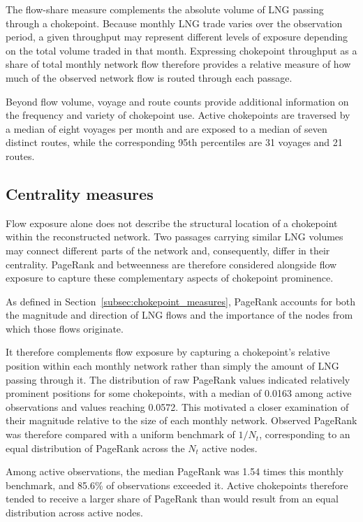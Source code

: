\documentclass[pdftex,12pt,openright,a4paper,oneside]{book}
\begin{document}
The flow-share measure complements the absolute volume of LNG passing through a chokepoint. 
Because monthly LNG trade varies over the observation period, a given throughput may represent different levels of exposure depending on the total volume traded in that month. 
Expressing chokepoint throughput as a share of total monthly network flow therefore provides a relative measure of how much of the observed network flow is routed through each passage.

Beyond flow volume, voyage and route counts provide additional information on the frequency and variety of chokepoint use. Active chokepoints are traversed by a median of eight voyages per month and are exposed to a median of seven distinct routes, while the corresponding 95th percentiles are 31 voyages and 21 routes.

\subsection{Centrality measures}
\label{subsec:chokepoint_centrality}

Flow exposure alone does not describe the structural location of a chokepoint within the reconstructed network. 
Two passages carrying similar LNG volumes may connect different parts of the network and, consequently, differ in their centrality.
PageRank and betweenness are therefore considered alongside flow exposure to capture these complementary aspects of chokepoint prominence.

As defined in Section~\ref{subsec:chokepoint_measures}, PageRank accounts for both the magnitude and direction of LNG flows and the importance of the nodes from which those flows originate.

It therefore complements flow exposure by capturing a chokepoint's relative position within each monthly network rather than simply the amount of LNG passing through it. 
The distribution of raw PageRank values indicated relatively prominent positions for some chokepoints, with a median of 0.0163 among active observations and values reaching 0.0572. This motivated a closer examination of their magnitude relative to the size of each monthly network. Observed PageRank was therefore compared with a uniform benchmark of \(1/N_t\), corresponding to an equal distribution of PageRank across the \(N_t\) active nodes.

Among active observations, the median PageRank was 1.54 times this monthly benchmark, and 85.6\% of observations exceeded it. Active chokepoints therefore tended to receive a larger share of PageRank than would result from an equal distribution across active nodes.
\end{document}
